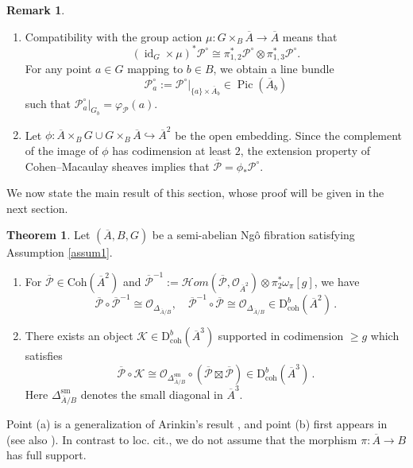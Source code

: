 \documentclass[11pt]{article}
\def\CO{\mathcal{O}}
\def\hom{\mathcal{H}om}
\def\dbcoh{\mathrm{D}^b_{\mathrm{coh}}}
\def\Pbar{\overline{\mathcal{P}}}
\def\Coh{\mathrm{Coh}}
\newcommand{\barA}{\overline{A}}
\newcommand{\K}{\mathcal{K}}
\newcommand{\Pic}{\operatorname{Pic}}
\theoremstyle{definition}
\newtheorem{theorem}[definition]{Theorem}
\newtheorem{remark}[definition]{Remark}
\begin{document}
\begin{remark}
    \begin{enumerate}[label = (\alph*)]
        \item Compatibility with the group action
        $\mu : G \times_B \barA \to \barA$ means that
        \begin{equation}\label{eq:compPoin}
            (\operatorname{id}_G \times \mu)^*\mathcal P^{\circ}
            \cong
            \pi_{1,2}^*\mathcal P^\circ \otimes \pi_{1,3}^*\mathcal P^\circ .
        \end{equation}
        For any point $a \in G$ mapping to $b \in B$, we obtain a line
		bundle
        \[
        \mathcal P_a^\circ
        :=
        \mathcal P^\circ|_{\{a\}\times \barA_b}
        \in \Pic(\barA_b)
        \]
        such that $\mathcal P_a^\circ|_{G_b} = \varphi_{\mathcal P}(a)$.

        \item Let $\phi : \barA \times_B G \cup G \times_B \barA \hookrightarrow \barA^2$ be the open embedding. Since the complement of the image of $\phi$ has codimension at least $2$, the extension property of Cohen--Macaulay sheaves implies that $\Pbar = \phi_*\mathcal P^\circ$.
    \end{enumerate}
\end{remark}

We now state the main result of this section, whose proof will be given in the
next section.
\begin{theorem}\label{thm:daf}
    Let $(\barA, B, G)$ be a semi-abelian Ng\^o fibration satisfying Assumption \ref{assum1}.
    \begin{enumerate}[label = (\alph*)]
        \item For $\Pbar \in \Coh(\barA^2)$ and $\Pbar^{-1}:= \hom(\Pbar,\CO_{\barA^2}) \otimes \pi_2^*\omega_\pi [g] $, we have
        \[
        \Pbar \circ \Pbar^{-1} \cong \CO_{\Delta_{\barA/B}}, \quad \Pbar^{-1} \circ \Pbar \cong \CO_{\Delta_{\barA/B}}\in \dbcoh(\barA^2)\,.
        \]
        \item There exists an object $\K \in \dbcoh(\barA^3)$ supported in codimension $\ge g$ which satisfies
        \[
        \Pbar \circ \K \cong \CO_{\Delta^{\mathrm{sm}}_{\barA/B}} \circ (\Pbar \boxtimes \Pbar) \in \dbcoh(\barA^3)\,.
        \]
        Here $\Delta^{\mathrm{sm}}_{\barA/B}$ denotes the small diagonal in $\barA^{3}$.
    \end{enumerate}
\end{theorem}

Point (a) is a generalization of Arinkin's result \cite{Arinkin2}, and point (b) first appears in \cite{PerverseFourierMSY25} (see also \cite{Daf}).
In contrast to loc. cit., we do not assume that the morphism $\pi : \barA \to B$ has full support.
\end{document}

